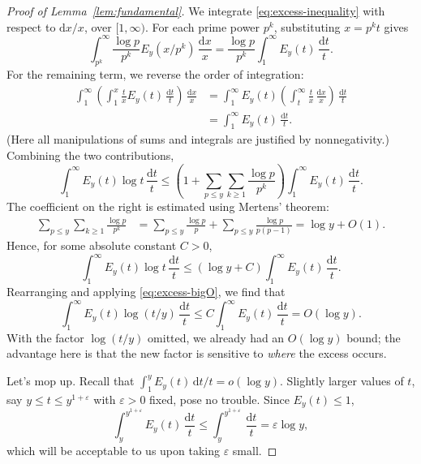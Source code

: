 \documentclass[11pt]{amsart}
\theoremstyle{remark}
\newcommand{\eps}{\varepsilon}
\newcommand{\dt}{\,\frac{\mathrm{d}t}{t}}
\newcommand{\dx}{\,\frac{\mathrm{d}x}{x}}
\begin{document}
\begin{proof}[Proof of Lemma~\ref{lem:fundamental}]
We integrate \eqref{eq:excess-inequality} with respect to $\mathrm{d}x/x$,
over $[1,\infty)$. For each prime power $p^k$, substituting
$x=p^kt$ gives
\[
\int_{p^k}^\infty\frac{\log p}{p^k}E_y(x/p^k)\dx
=\frac{\log p}{p^k}\int_1^\infty E_y(t)\dt.
\]
For the remaining term, we reverse the order of integration:
\[
\begin{aligned}
\int_1^\infty\left(\int_1^x\frac tx E_y(t)\dt\right)\dx
&=\int_1^\infty E_y(t)
 \left(\int_t^\infty\frac tx\dx\right)\dt\\
&=\int_1^\infty E_y(t)\dt.
\end{aligned}
\]
(Here all manipulations of sums and integrals are justified by nonnegativity.) Combining the two contributions,
\[
\int_1^\infty E_y(t)\log t\dt
\le\left(1+\sum_{p\le y}\sum_{k\ge1}\frac{\log p}{p^k}\right)
\int_1^\infty E_y(t)\dt.
\]
The coefficient on the right is estimated using Mertens' theorem:
\[
\begin{aligned}
\sum_{p\le y}\sum_{k\ge1}\frac{\log p}{p^k}
&=\sum_{p\le y}\frac{\log p}{p}
  +\sum_{p\le y}\frac{\log p}{p(p-1)}
=\log y+O(1).
\end{aligned}
\]
Hence, for some absolute
constant $C>0$,
\[
\int_1^\infty E_y(t)\log t\dt
\le(\log y+C)\int_1^\infty E_y(t)\dt.
\]
Rearranging and applying \eqref{eq:excess-bigO}, we find that
\begin{equation}\label{eq:centered}
\int_1^\infty E_y(t)\log(t/y)\dt
\le C\int_1^\infty E_y(t)\dt=O(\log y).
\end{equation}
With the factor $\log(t/y)$ omitted, we already had an $O(\log{y})$ bound; the advantage here is that the new factor is sensitive to \emph{where} the excess occurs.

Let's mop up. Recall that $\int_1^{y} E_y(t)\, \mathrm{d}t/t = o(\log{y})$. Slightly larger values of $t$, say $y\le t \le y^{1+\eps}$ with $\eps > 0$ fixed, pose no trouble. Since $E_y(t)\le1$,
\[
\int_y^{y^{1+\eps}}E_y(t)\dt
\le\int_y^{y^{1+\eps}}\dt
=\eps\log y,
\]
which will be acceptable to us upon taking $\eps$ small.


\end{proof}
\end{document}
